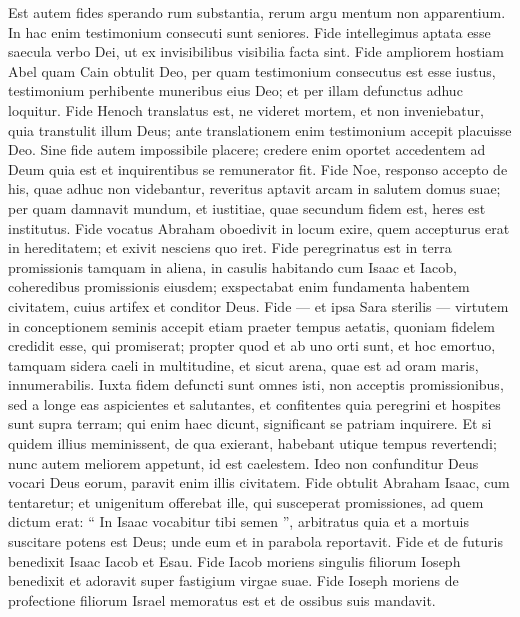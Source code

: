 \begin{biblechapter}
\begin{biblechapter}
\begin{biblechapter}
\begin{biblechapter}
\begin{biblechapter}
\begin{biblechapter}
\begin{biblechapter}
\begin{biblechapter}
\begin{biblechapter}
\begin{biblechapter}
\begin{biblechapter}
\verse Est autem fides sperando rum substantia, rerum argu mentum non apparentium. 
 \verse In hac enim testimonium consecuti sunt seniores.
 \verse Fide intellegimus aptata esse saecula verbo Dei, ut ex invisibilibus visibilia facta sint.
 \verse Fide ampliorem hostiam Abel quam Cain obtulit Deo, per quam testimonium consecutus est esse iustus, testimonium perhibente muneribus eius Deo; et per illam defunctus adhuc loquitur.
 \verse Fide Henoch translatus est, ne videret mortem, et non inveniebatur, quia transtulit illum Deus; ante translationem enim testimonium accepit placuisse Deo. 
\verse Sine fide autem impossibile placere; credere enim oportet accedentem ad Deum quia est et inquirentibus se remunerator fit.
 \verse Fide Noe, responso accepto de his, quae adhuc non videbantur, reveritus aptavit arcam in salutem domus suae; per quam damnavit mundum, et iustitiae, quae secundum fidem est, heres est institutus.
 \verse Fide vocatus Abraham oboedivit in locum exire, quem accepturus erat in hereditatem; et exivit nesciens quo iret.
 \verse Fide peregrinatus est in terra promissionis tamquam in aliena, in casulis habitando cum Isaac et Iacob, coheredibus promissionis eiusdem; 
\verse exspectabat enim fundamenta habentem civitatem, cuius artifex et conditor Deus.
 \verse Fide — et ipsa Sara sterilis — virtutem in conceptionem seminis accepit etiam praeter tempus aetatis, quoniam fidelem credidit esse, qui promiserat; 
\verse propter quod et ab uno orti sunt, et hoc emortuo, tamquam sidera caeli in multitudine, et sicut arena, quae est ad oram maris, innumerabilis.
 \verse Iuxta fidem defuncti sunt omnes isti, non acceptis promissionibus, sed a longe eas aspicientes et salutantes, et confitentes quia peregrini et hospites sunt supra terram; 
\verse qui enim haec dicunt, significant se patriam inquirere. 
\verse Et si quidem illius meminissent, de qua exierant, habebant utique tempus revertendi; 
\verse nunc autem meliorem appetunt, id est caelestem. Ideo non confunditur Deus vocari Deus eorum, paravit enim illis civitatem.
 \verse Fide obtulit Abraham Isaac, cum tentaretur; et unigenitum offerebat ille, qui susceperat promissiones, 
\verse ad quem dictum erat: “ In Isaac vocabitur tibi semen ”, 
\verse arbitratus quia et a mortuis suscitare potens est Deus; unde eum et in parabola reportavit.
 \verse Fide et de futuris benedixit Isaac Iacob et Esau.
 \verse Fide Iacob moriens singulis filiorum Ioseph benedixit et adoravit super fastigium virgae suae.
 \verse Fide Ioseph moriens de profectione filiorum Israel memoratus est et de ossibus suis mandavit.

\end{biblechapter}
\end{biblechapter}
\end{biblechapter}
\end{biblechapter}
\end{biblechapter}
\end{biblechapter}
\end{biblechapter}
\end{biblechapter}
\end{biblechapter}
\end{biblechapter}
\end{biblechapter}

